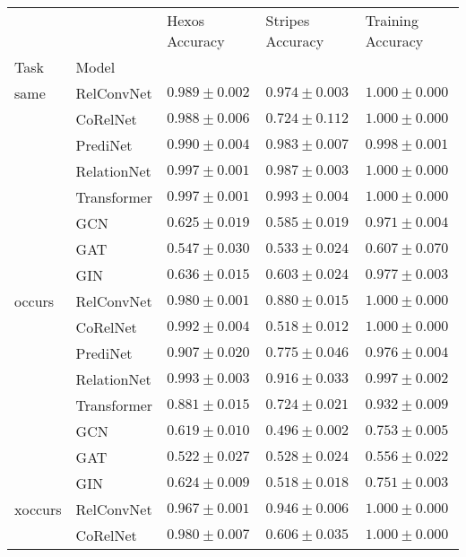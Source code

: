 \begin{tabular}{lllll}
\toprule
              &     &     Hexos Accuracy &   Stripes Accuracy &  Training Accuracy \\
Task & Model &                    &                    &                    \\
\midrule
same & RelConvNet &  $0.989 \pm 0.002$ &  $0.974 \pm 0.003$ &  $1.000 \pm 0.000$ \\
              & CoRelNet &  $0.988 \pm 0.006$ &  $0.724 \pm 0.112$ &  $1.000 \pm 0.000$ \\
              & PrediNet &  $0.990 \pm 0.004$ &  $0.983 \pm 0.007$ &  $0.998 \pm 0.001$ \\
              & RelationNet &  $0.997 \pm 0.001$ &  $0.987 \pm 0.003$ &  $1.000 \pm 0.000$ \\
              & Transformer &  $0.997 \pm 0.001$ &  $0.993 \pm 0.004$ &  $1.000 \pm 0.000$ \\
              & GCN &  $0.625 \pm 0.019$ &  $0.585 \pm 0.019$ &  $0.971 \pm 0.004$ \\
              & GAT &  $0.547 \pm 0.030$ &  $0.533 \pm 0.024$ &  $0.607 \pm 0.070$ \\
              & GIN &  $0.636 \pm 0.015$ &  $0.603 \pm 0.024$ &  $0.977 \pm 0.003$ \\\hline
occurs & RelConvNet &  $0.980 \pm 0.001$ &  $0.880 \pm 0.015$ &  $1.000 \pm 0.000$ \\
              & CoRelNet &  $0.992 \pm 0.004$ &  $0.518 \pm 0.012$ &  $1.000 \pm 0.000$ \\
              & PrediNet &  $0.907 \pm 0.020$ &  $0.775 \pm 0.046$ &  $0.976 \pm 0.004$ \\
              & RelationNet &  $0.993 \pm 0.003$ &  $0.916 \pm 0.033$ &  $0.997 \pm 0.002$ \\
              & Transformer &  $0.881 \pm 0.015$ &  $0.724 \pm 0.021$ &  $0.932 \pm 0.009$ \\
              & GCN &  $0.619 \pm 0.010$ &  $0.496 \pm 0.002$ &  $0.753 \pm 0.005$ \\
              & GAT &  $0.522 \pm 0.027$ &  $0.528 \pm 0.024$ &  $0.556 \pm 0.022$ \\
              & GIN &  $0.624 \pm 0.009$ &  $0.518 \pm 0.018$ &  $0.751 \pm 0.003$ \\\hline
xoccurs & RelConvNet &  $0.967 \pm 0.001$ &  $0.946 \pm 0.006$ &  $1.000 \pm 0.000$ \\
              & CoRelNet &  $0.980 \pm 0.007$ &  $0.606 \pm 0.035$ &  $1.000 \pm 0.000$ \\

\end{tabular}
